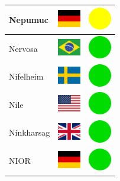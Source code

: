 \documentclass[12pt, a4paper, twoside]{report}
\begin{document}
\begin{center}
\begin{longtable}{|p{5cm}|p{2cm}|p{2cm}|}
Nepumuc & \includegraphics[width=1cm]{4x3/de} & \includegraphics[width=1cm]{likes/m} \\ \hline
Nervosa & \includegraphics[width=1cm]{4x3/br} & \includegraphics[width=1cm]{likes/y} \\ \hline
Nifelheim & \includegraphics[width=1cm]{4x3/se} & \includegraphics[width=1cm]{likes/y} \\ \hline
Nile & \includegraphics[width=1cm]{4x3/us} & \includegraphics[width=1cm]{likes/y} \\ \hline
Ninkharsag & \includegraphics[width=1cm]{4x3/gb} & \includegraphics[width=1cm]{likes/y} \\ \hline
NIOR & \includegraphics[width=1cm]{4x3/de} & \includegraphics[width=1cm]{likes/y} \\ \hline

\end{longtable}
\end{center}
\end{document}
